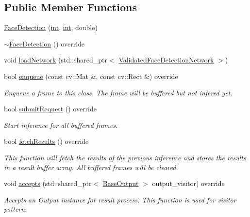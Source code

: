 \subsection*{Public Member Functions}
\begin{DoxyCompactItemize}
\item 
\hyperlink{classopenvino__service_1_1FaceDetection_a7af587f1765e10fe57cb7e23fc11b972}{Face\+Detection} (\hyperlink{CMakeCache_8txt_a79a3d8790b2588b09777910863574e09}{int}, \hyperlink{CMakeCache_8txt_a79a3d8790b2588b09777910863574e09}{int}, double)
\item 
\hyperlink{classopenvino__service_1_1FaceDetection_ab7ca36b46bdc69a8f1ca582ed9494c06}{$\sim$\+Face\+Detection} () override
\item 
void \hyperlink{classopenvino__service_1_1FaceDetection_a6594d4aaefcbeee2d1f248891cc8fe86}{load\+Network} (std\+::shared\+\_\+ptr$<$ \hyperlink{classValidatedFaceDetectionNetwork}{Validated\+Face\+Detection\+Network} $>$)
\item 
bool \hyperlink{classopenvino__service_1_1FaceDetection_a7332817c496f2306b2a9ca3b45a7ec48}{enqueue} (const cv\+::\+Mat \&, const cv\+::\+Rect \&) override
\begin{DoxyCompactList}\small\item\em Enqueue a frame to this class. The frame will be buffered but not infered yet. \end{DoxyCompactList}\item 
bool \hyperlink{classopenvino__service_1_1FaceDetection_ad8c87c0d59af0f36030fed55a0bcec4b}{submit\+Request} () override
\begin{DoxyCompactList}\small\item\em Start inference for all buffered frames. \end{DoxyCompactList}\item 
bool \hyperlink{classopenvino__service_1_1FaceDetection_af3153d2032ed93c03aa0fa62b90f5526}{fetch\+Results} () override
\begin{DoxyCompactList}\small\item\em This function will fetch the results of the previous inference and stores the results in a result buffer array. All buffered frames will be cleared. \end{DoxyCompactList}\item 
void \hyperlink{classopenvino__service_1_1FaceDetection_a5c06d03813e7bf494f7908577d8392c5}{accepts} (std\+::shared\+\_\+ptr$<$ \hyperlink{classBaseOutput}{Base\+Output} $>$ output\+\_\+visitor) override
\begin{DoxyCompactList}\small\item\em Accepts an Output instance for result process. This function is used for visitor pattern. \end{DoxyCompactList}\item 

\end{DoxyCompactItemize}
